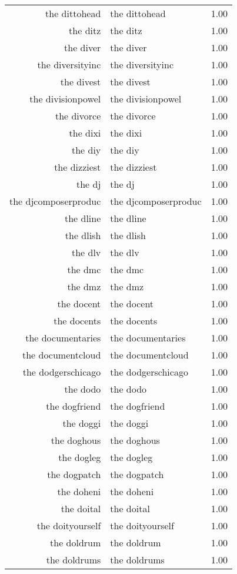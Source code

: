 \begin{table}[ht]
\begin{tabular}{rlr}
  the dittohead & the dittohead & 1.00 \\ 
  the ditz & the ditz & 1.00 \\ 
  the diver & the diver & 1.00 \\ 
  the diversityinc & the diversityinc & 1.00 \\ 
  the divest & the divest & 1.00 \\ 
  the divisionpowel & the divisionpowel & 1.00 \\ 
  the divorce & the divorce & 1.00 \\ 
  the dixi & the dixi & 1.00 \\ 
  the diy & the diy & 1.00 \\ 
  the dizziest & the dizziest & 1.00 \\ 
  the dj & the dj & 1.00 \\ 
  the djcomposerproduc & the djcomposerproduc & 1.00 \\ 
  the dline & the dline & 1.00 \\ 
  the dlish & the dlish & 1.00 \\ 
  the dlv & the dlv & 1.00 \\ 
  the dmc & the dmc & 1.00 \\ 
  the dmz & the dmz & 1.00 \\ 
  the docent & the docent & 1.00 \\ 
  the docents & the docents & 1.00 \\ 
  the documentaries & the documentaries & 1.00 \\ 
  the documentcloud & the documentcloud & 1.00 \\ 
  the dodgerschicago & the dodgerschicago & 1.00 \\ 
  the dodo & the dodo & 1.00 \\ 
  the dogfriend & the dogfriend & 1.00 \\ 
  the doggi & the doggi & 1.00 \\ 
  the doghous & the doghous & 1.00 \\ 
  the dogleg & the dogleg & 1.00 \\ 
  the dogpatch & the dogpatch & 1.00 \\ 
  the doheni & the doheni & 1.00 \\ 
  the doital & the doital & 1.00 \\ 
  the doityourself & the doityourself & 1.00 \\ 
  the doldrum & the doldrum & 1.00 \\ 
  the doldrums & the doldrums & 1.00 \\ 

\end{tabular}
\end{table}

